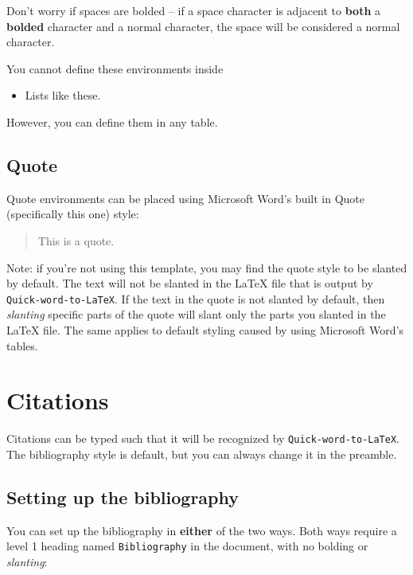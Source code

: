 \documentclass[12pt]{article}
\theoremstyle{plain}
\theoremstyle{remark}
\theoremstyle{definition}
\begin{document}
Don't worry if spaces are bolded -- if a space character is adjacent to
\textbf{both} a \textbf{bolded} character and a normal character, the
space will be considered a normal character.

You cannot define these environments inside

\begin{itemize}
\item
  Lists like these.
\end{itemize}

However, you can define them in any table.


\subsection{Quote}

Quote environments can be placed using Microsoft Word's built in Quote
(specifically this one) style:

\begin{quote}
This is a quote.
\end{quote}

Note: if you're not using this template, you may find the quote style to
be slanted by default. The text will not be slanted in the LaTeX file
that is output by \texttt{Quick-word-to-LaTeX}. If the text in the quote
is not slanted by default, then \emph{slanting} specific parts of the
quote will slant only the parts you slanted in the LaTeX file. The same
applies to default styling caused by using Microsoft Word's tables.


\section{Citations}

Citations can be typed such that it will be recognized by
\texttt{Quick-word-to-LaTeX}. The bibliography style is default, but you
can always change it in the preamble.


\subsection{Setting up the
bibliography}

You can set up the bibliography in \textbf{either} of the two ways. Both
ways require a level 1 heading named \texttt{Bibliography} in the
document, with no bolding or \emph{slanting}:
\end{document}
